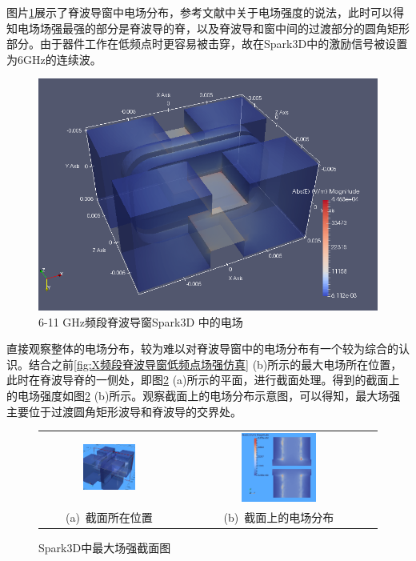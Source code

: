 \documentclass[master]{thesis-uestc}
\begin{document}
图片\ref{fig:X波段Spark3D中的电场}展示了脊波导窗中电场分布，参考文献\cite{guobao_2019_intera}中关于电场强度的说法，此时可以得知电场场强最强的部分是脊波导的脊，以及脊波导和窗中间的过渡部分的圆角矩形部分。由于器件工作在低频点时更容易被击穿，故在Spark3D中的激励信号被设置为6GHz的连续波。
\begin{figure}[!htb]
    \centering
    \includegraphics[width=0.5\linewidth]{pic/chapter3/X波段Spark3D中的电场.png}
    \caption{6-11 GHz频段脊波导窗Spark3D 中的电场}
    \label{fig:X波段Spark3D中的电场}
\end{figure}
直接观察整体的电场分布，较为难以对脊波导窗中的电场分布有一个较为综合的认识。结合之前\ref{fig:X频段脊波导窗低频点场强仿真} (b)所示的最大电场所在位置，此时在脊波导脊的一侧处，即图\ref{fig:XSP最大场强截面图} (a)所示的平面，进行截面处理。得到的截面上的电场强度如图\ref{fig:XSP最大场强截面图} (b)所示。观察截面上的电场分布示意图，可以得知，最大场强主要位于过渡圆角矩形波导和脊波导的交界处。
\begin{figure}[!htb]
    \small
    \centering
    \begin{tabular}{@{\ }c@{\ }c}
        \includegraphics[width=0.4\textwidth]{pic/chapter3/XSP3D电场截面示意.png} & 
        \hspace{5pt}
        \includegraphics[width=0.4\textwidth]{pic/chapter3/XSP3D截面上的电场分布.png}     \\
        \mbox{\small (a) 截面所在位置}                                                                               & 
        \mbox{\small (b) 截面上的电场分布}                                                                                  \\
    \end{tabular}
    \caption{Spark3D中最大场强截面图}
    \label{fig:XSP最大场强截面图}
\end{figure}
\end{document}
